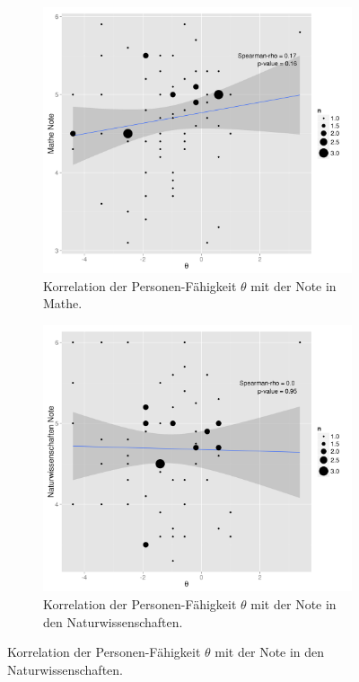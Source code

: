  \begin{figure}[htp]
 \centering
 \begin{subfigure}{0.49\textwidth}
   \includegraphics[width=1.0\linewidth]{graphics/corPersonenMathe.png}
   \caption{Korrelation der Personen-Fähigkeit $\theta$ mit der Note in Mathe.}
   \label{fig:corPersonenMathe}
 \end{subfigure}
 \begin{subfigure}{0.49\textwidth}
   \includegraphics[width=1.0\linewidth]{graphics/corPersonenNatw.png}
   \caption{Korrelation der Personen-Fähigkeit $\theta$ mit der Note in den Naturwissenschaften.}
   \label{fig:corPersonenNatW}
 \end{subfigure}
  \end{figure}
